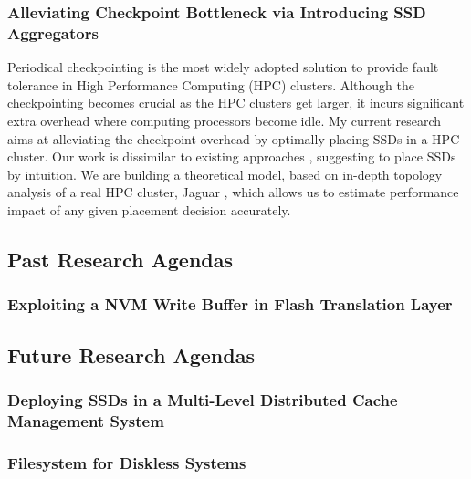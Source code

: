 \documentclass[letterpaper, 10pt]{article}
\begin{document}
\subsubsection*{Alleviating Checkpoint Bottleneck via Introducing SSD
Aggregators}

Periodical checkpointing is the most widely adopted solution to provide
fault tolerance in High Performance Computing (HPC) clusters. Although the
checkpointing becomes crucial as the HPC clusters get larger, it
incurs significant extra overhead where computing processors become idle.
My current research aims at alleviating the checkpoint overhead by optimally
placing SSDs in a HPC cluster. Our work is dissimilar to existing approaches
\cite{bg}\cite{burst},
suggesting to place SSDs by intuition.
We are building a theoretical model,
based on in-depth topology analysis of a real HPC cluster, Jaguar \cite{jaguar},
which allows us to estimate performance impact of any given placement decision
accurately.

\subsection*{Past Research Agendas}

\subsubsection*{Exploiting a NVM Write Buffer in Flash Translation Layer}

\subsection*{Future Research Agendas}

\subsubsection*{Deploying SSDs in a Multi-Level Distributed Cache Management
System}

\subsubsection*{Filesystem for Diskless Systems}

\vspace{0.5cm}

\end{document}
